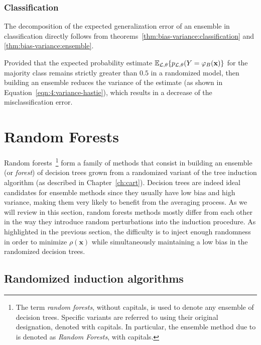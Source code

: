 \subsubsection{Classification}

The decomposition of the expected generalization error of an ensemble in
classification directly follows from theorems~\ref{thm:bias-variance:classification} and
\ref{thm:bias-variance:ensemble}.

Provided that the expected probability estimate $\mathbb{E}_{{\cal L},\theta}\{
p_{{\cal L},\theta}(Y=\varphi_B(\mathbf{x}) \}$ for the majority class remains
strictly greater than $0.5$ in a randomized model, then building an ensemble
reduces the variance of the estimate (as shown in Equation~\ref{eqn:4:variance-hastie}),
which results in a decrease of the misclassification error.


\section{Random Forests}
\label{sec:4:random-forests}

Random forests~\footnote{The term
\textit{random forests}, without capitals, is used to denote any ensemble of decision
trees. Specific variants are referred to using their original designation,
denoted with capitals. In particular, the ensemble method due to
\citet{breiman:2001} is denoted as \textit{Random Forests}, with capitals.}
form a family of methods that consist in building an ensemble (or
\textit{forest}) of decision trees grown from a randomized variant of the tree
induction algorithm (as described in Chapter~\ref{ch:cart}). Decision trees are
indeed ideal candidates for ensemble methods since they usually have low bias
and high variance, making them very likely to benefit from the averaging
process. As we will review in this section, random forests methods mostly
differ from each other in the way they introduce random perturbations into the
induction procedure. As highlighted in the previous section, the difficulty is
to inject enough randomness in order to minimize $\rho(\mathbf{x})$ while
simultaneously maintaining a low bias in the randomized decision trees.

\subsection{Randomized induction algorithms}

